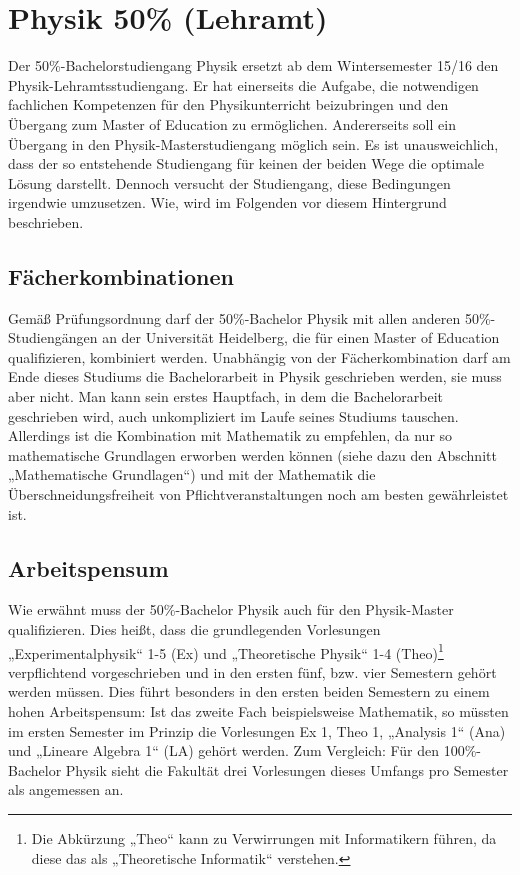 \section{Physik 50\% (Lehramt)} %

Der 50\%-Bachelorstudiengang Physik ersetzt ab dem Wintersemester 15/16 den Physik-Lehramtsstudiengang. Er hat einerseits die Aufgabe, die notwendigen fachlichen Kompetenzen für den Physikunterricht beizubringen und den Übergang zum Master of Education zu ermöglichen. Andererseits soll ein Übergang in den Physik-Masterstudiengang möglich sein. Es ist unausweichlich, dass der so entstehende Studiengang für keinen der beiden Wege die optimale Lösung darstellt. Dennoch versucht der Studiengang, diese Bedingungen irgendwie umzusetzen. Wie, wird im Folgenden vor diesem Hintergrund beschrieben.

\subsection{Fächerkombinationen}

Gemäß Prüfungsordnung darf der 50\%-Bachelor Physik mit allen anderen 50\%-Studiengängen an der Universität Heidelberg, die für einen Master of Education qualifizieren, kombiniert werden. Unabhängig von der Fächerkombination darf am Ende dieses Studiums die Bachelorarbeit in Physik geschrieben werden, sie muss aber nicht. Man kann sein erstes Hauptfach, in dem die Bachelorarbeit geschrieben wird, auch unkompliziert im Laufe seines Studiums tauschen. Allerdings ist die Kombination mit Mathematik zu empfehlen, da nur so mathematische Grundlagen erworben werden können (siehe dazu den Abschnitt „Mathematische Grundlagen“) und mit der Mathematik die Überschneidungsfreiheit von Pflichtveranstaltungen noch am besten gewährleistet ist.

\subsection{Arbeitspensum}

Wie erwähnt muss der 50\%-Bachelor Physik auch für den Physik-Master qualifizieren. Dies heißt, dass die grundlegenden Vorlesungen „Experimentalphysik“ 1-5 (\gls{Ex}) und „Theoretische Physik“ 1-4 (\gls{Theo})\footnote{Die Abkürzung „Theo“ kann zu Verwirrungen mit Informatikern führen, da diese das als „Theoretische Informatik“ verstehen.} verpflichtend vorgeschrieben und in den ersten fünf, bzw. vier Semestern gehört werden müssen. Dies führt besonders in den ersten beiden Semestern zu einem hohen Arbeitspensum: Ist das zweite Fach beispielsweise Mathematik, so müssten im ersten Semester im Prinzip die Vorlesungen Ex 1, Theo 1, „Analysis 1“ (\gls{Ana}) und „Lineare Algebra 1“ (\gls{LA}) gehört werden. Zum Vergleich: Für den 100\%-Bachelor Physik sieht die Fakultät drei Vorlesungen dieses Umfangs pro Semester als angemessen an.

